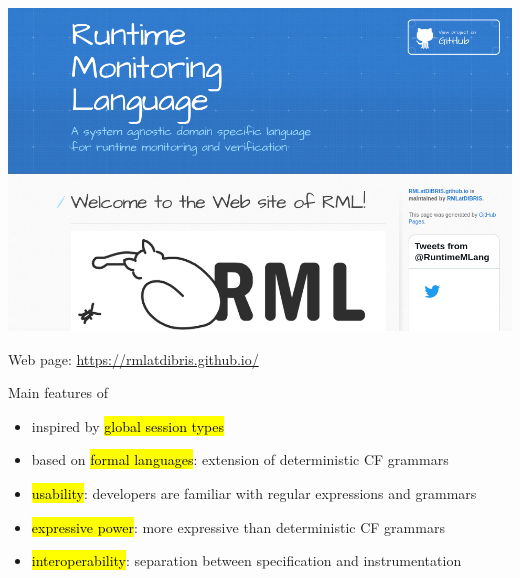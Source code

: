 \documentclass[10pt,usenames,dvipsnames]{beamer}
\begin{document}


\begin{frame}{\rml}
  \begin{center}
    \includegraphics[height=0.7\textheight]{images/rmlweb}
  \end{center}

  \rml Web page: \href{https://rmlatdibris.github.io/}{https://rmlatdibris.github.io/}
\end{frame}


\begin{frame}{\rml}

  \begin{block}{Main features of \rml}
    \begin{itemize}
    \item inspired by \hl{global session types}
    \item based on \hl{formal languages}: extension of deterministic CF grammars 
    \item \hl{usability}: developers are familiar with regular expressions and grammars
    \item \hl{expressive power}: more expressive than deterministic CF grammars
    \item \hl{interoperability}: separation between specification and instrumentation
    \end{itemize}
  \end{block}
\end{frame}

\end{document}
